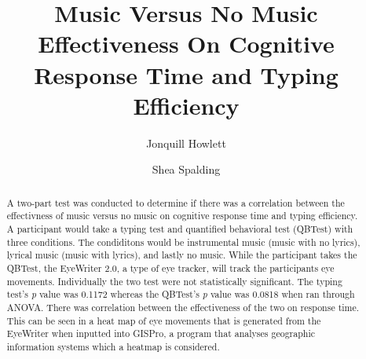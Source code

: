 \documentclass[manuscript, screen, review]{acmart} %
\begin{document}
\title{Music Versus No Music Effectiveness On Cognitive Response Time and Typing Efficiency}

\author{Jonquill Howlett}

\author{Shea Spalding}

\renewcommand{\shortauthors}{Howlett, Spalding}

\begin{abstract}
A two-part test was conducted to determine if there was a correlation between the effectivness of music versus no music on cognitive response time
and typing efficiency. A participant would take a typing test and quantified behavioral test (QBTest) with three conditions.
The condiditons would be instrumental music (music with no lyrics), lyrical music (music with lyrics), and lastly no music. While the participant takes the QBTest, the EyeWriter 2.0,
a type of eye tracker, will track the participants eye movements.
Individually the two test were not statistically significant. The typing test's \textit{p} value was 0.1172 whereas the QBTest's \textit{p} value was 0.0818 when ran through ANOVA. There was correlation between the effectiveness of the two on response time. This 
can be seen in a heat map of eye movements that is generated from the EyeWriter when inputted into GISPro, a program that analyses geographic information systems which a heatmap is considered.

\end{abstract}

\maketitle
\end{document}

